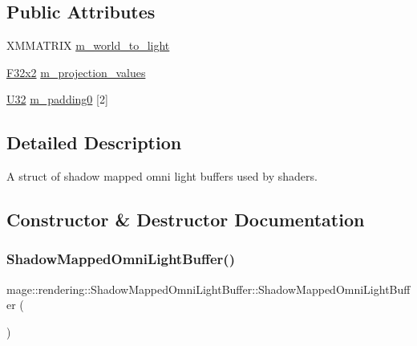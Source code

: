 \subsection*{Public Attributes}
\begin{DoxyCompactItemize}
\item 
X\+M\+M\+A\+T\+R\+IX \mbox{\hyperlink{structmage_1_1rendering_1_1_shadow_mapped_omni_light_buffer_a6ad3f982000ca1d68c3897589aa89798}{m\+\_\+world\+\_\+to\+\_\+light}}
\item 
\mbox{\hyperlink{namespacemage_a9dc0d34d6ecc87e4cfa4a826102117bc}{F32x2}} \mbox{\hyperlink{structmage_1_1rendering_1_1_shadow_mapped_omni_light_buffer_a29016735134bb44c6c6f0d52fbf9ef2c}{m\+\_\+projection\+\_\+values}}
\item 
\mbox{\hyperlink{namespacemage_aa5d6eaabaac3cdd01873d6a3d27e90f3}{U32}} \mbox{\hyperlink{structmage_1_1rendering_1_1_shadow_mapped_omni_light_buffer_a01a76a39534ba04a2b1fe77ae5d1522c}{m\+\_\+padding0}} \mbox{[}2\mbox{]}
\end{DoxyCompactItemize}


\subsection{Detailed Description}
A struct of shadow mapped omni light buffers used by shaders. 

\subsection{Constructor \& Destructor Documentation}
\mbox{\label{structmage_1_1rendering_1_1_shadow_mapped_omni_light_buffer_a3b9f6ffd582185ea739410aeeec8a446}} 
\subsubsection{\texorpdfstring{Shadow\+Mapped\+Omni\+Light\+Buffer()}{ShadowMappedOmniLightBuffer()}\hspace{0.1cm}{\footnotesize\ttfamily [1/3]}}
{\footnotesize\ttfamily mage\+::rendering\+::\+Shadow\+Mapped\+Omni\+Light\+Buffer\+::\+Shadow\+Mapped\+Omni\+Light\+Buffer (\begin{DoxyParamCaption}{ }\end{DoxyParamCaption})\hspace{0.3cm}{\ttfamily [noexcept]}}

